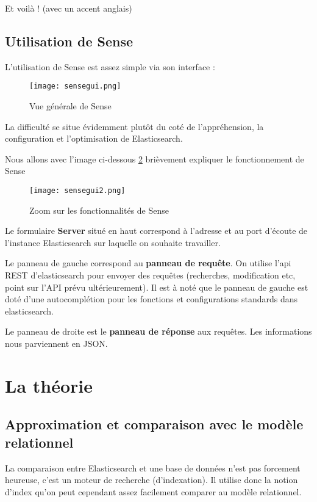 Et voilà ! \footnotesize{(avec un accent anglais)}

\subsection{Utilisation de Sense}
L'utilisation de Sense est assez simple via son interface :

\begin{figure}[H]
\center
\texttt{[image: sensegui.png]}
\label{fig:sensegui.png}
\caption{Vue générale de Sense}
\end{figure}

La difficulté se situe évidemment plutôt du coté de l'appréhension, la configuration
et l'optimisation de Elasticsearch.

Nous allons avec l'image ci-dessous \ref{fig:sensegui2.png} brièvement expliquer le fonctionnement de Sense
\begin{figure}[H]
\center
\texttt{[image: sensegui2.png]}
\label{fig:sensegui2.png}
\caption{Zoom sur les fonctionnalités de Sense}
\end{figure}
Le formulaire \textbf{Server} situé en haut correspond à l'adresse et au port d'écoute 
de l'instance Elasticsearch sur laquelle on souhaite travailler.

Le panneau de gauche correspond au \textbf{panneau de requête}. On utilise l'api REST d'elasticsearch
pour envoyer des requêtes (recherches, modification etc, point sur l'API prévu 
ultérieurement). Il est à noté que le panneau de gauche est doté d'une autocomplétion
pour les fonctions et configurations standards dans elasticsearch.

Le panneau de droite est le \textbf{panneau de réponse} aux requêtes. Les informations
nous parviennent en JSON.

\section{La théorie}

\subsection{Approximation et comparaison avec le modèle relationnel}
La comparaison entre Elasticsearch et une base de données n'est pas forcement heureuse,
c'est un moteur de recherche (d'indexation). Il utilise donc la notion d'index   
qu'on peut cependant assez facilement comparer au modèle relationnel.

